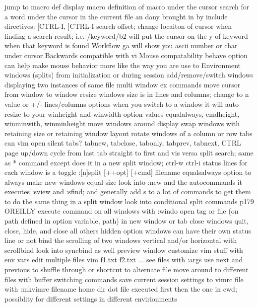 \documentclass[12pt]{book}
\begin{document}
{  jump to macro def
  display macro definition of macro under the cursor
  search for a word under the cursor in the current file an dany brought in by include directives: [CTRL-I, ]CTRL-I
  search offset; change locaiton of cursor when finding a search result; i.e. /keyword/b2 will put the cursor on the y of keyword when that keyword is found
Workflow
  ga will show you ascii number or char under cursor
  Backwards compatible with vi
  Mouse compatability
    behave option can help make mouse behavior more like the way you are use to
  Environment
    windows (splits)
      from initialization or during session
      add/remove/switch windows
      displaying two instances of same file
      multi window ex commands
      move cursor from window to window
      resize windows
        size is in lines and columns; change to n value or +/- lines/columns
        options
          when you switch to a window it will auto resize to your winheight and winwidth option values
          equalalways, cmdheight, winminwith, winminheight
      move windows around display
        swap windows with retaining size or retaining window layout
        rotate windows of a column or row
      tabs
        can vim open silent tabs?
        tabnew, tabclose, tabonly, tabprev, tabnext, CTRL page up/down
        cycle from last tab straight to first and vis versa
      split search; same as * command except does it in a new split window; ctrl-w ctrl-i
      status lines for each window is a toggle
      :[n]split [++opt] [+cmd] filename
      equalsalways option to always make new windows equal size
      look into :new and the autocommands it executes
      :sview and :sfind; and generally add s to a lot of commands to get them to do the same thing in a split window
      look into conditional split commands p179 OREILLY
      execute command on all windows with :windo
      open tag or file (on path defined in option variable, path) in new window or tab
      close windows
        quit, close, hide, and close all others
          hidden option
      windows can have their own status line or not
      bind the scrolling of two windows vertical and/or horizontal with scrollbind
        look into syncbind as well
      preview window
    customize vim stuff with env vars
    edit multiple files
      vim f1.txt f2.txt ...
      see files with :args
      use next and previous to shuffle through or shortcut to alternate file
    move around to different files with buffer switching commands
    save current session settings to vimrc file with :mkvimrc filename
  home dir dot file executed first then the one in cwd; possiblity for different settings in different envirionments
}
\end{document}
